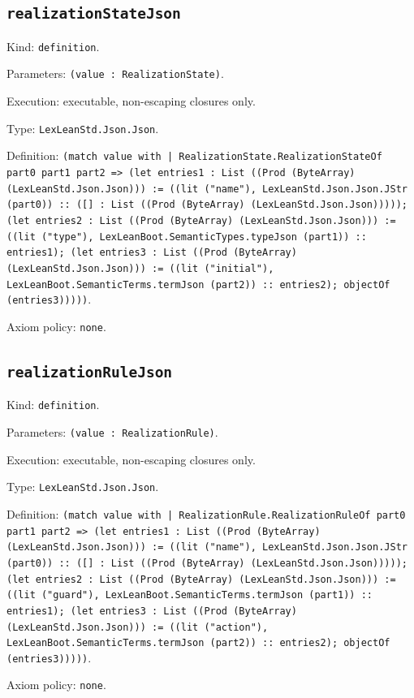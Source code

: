 \documentclass[11pt]{article}
\begin{document}
\subsection*{\texttt{realizationStateJson}}
\noindent Kind: \texttt{definition}.\par
\noindent Parameters: \texttt{(value : RealizationState)}.\par
\noindent Execution: executable, non-escaping closures only.\par
\noindent Type: \texttt{LexLeanStd.Json.Json}.\par
\noindent Definition: \texttt{(match value with | RealizationState.RealizationStateOf part0 part1 part2 => (let entries1 : List ((Prod (ByteArray) (LexLeanStd.Json.Json))) := ((lit ("name"), LexLeanStd.Json.Json.JStr (part0)) :: ([] : List ((Prod (ByteArray) (LexLeanStd.Json.Json))))); (let entries2 : List ((Prod (ByteArray) (LexLeanStd.Json.Json))) := ((lit ("type"), LexLeanBoot.SemanticTypes.typeJson (part1)) :: entries1); (let entries3 : List ((Prod (ByteArray) (LexLeanStd.Json.Json))) := ((lit ("initial"), LexLeanBoot.SemanticTerms.termJson (part2)) :: entries2); objectOf (entries3)))))}.\par
\noindent Axiom policy: \texttt{none}.\par
\subsection*{\texttt{realizationRuleJson}}
\noindent Kind: \texttt{definition}.\par
\noindent Parameters: \texttt{(value : RealizationRule)}.\par
\noindent Execution: executable, non-escaping closures only.\par
\noindent Type: \texttt{LexLeanStd.Json.Json}.\par
\noindent Definition: \texttt{(match value with | RealizationRule.RealizationRuleOf part0 part1 part2 => (let entries1 : List ((Prod (ByteArray) (LexLeanStd.Json.Json))) := ((lit ("name"), LexLeanStd.Json.Json.JStr (part0)) :: ([] : List ((Prod (ByteArray) (LexLeanStd.Json.Json))))); (let entries2 : List ((Prod (ByteArray) (LexLeanStd.Json.Json))) := ((lit ("guard"), LexLeanBoot.SemanticTerms.termJson (part1)) :: entries1); (let entries3 : List ((Prod (ByteArray) (LexLeanStd.Json.Json))) := ((lit ("action"), LexLeanBoot.SemanticTerms.termJson (part2)) :: entries2); objectOf (entries3)))))}.\par
\noindent Axiom policy: \texttt{none}.\par
\end{document}
